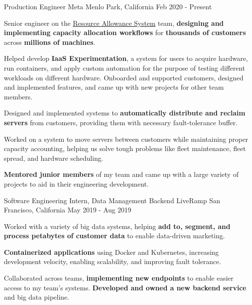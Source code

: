 

\begin{cventries}


\cventry
{Production Engineer}
{\acvHeaderIconSep Meta}
{Menlo Park, California}
{Feb 2020 - Present}
{
\begin{cvitems}
\item Senior engineer on the \href{https://dl.acm.org/doi/10.1145/3477132.3483578}{Resource Allowance System} team, \textbf{designing and implementing capacity allocation workflows} for \textbf{thousands of customers} across \textbf{millions of machines}. 
\item Helped develop \textbf{IaaS Experimentation}, a system for users to acquire hardware, run containers, and apply custom automation for the purpose of testing different workloads on different hardware. Onboarded and supported customers, designed and implemented features, and came up with new projects for other team members. 
\item Designed and implemented systems to \textbf{automatically distribute and reclaim servers} from customers, providing them with necessary fault-tolerance buffer. 
\item Worked on a system to move servers between customers while maintaining proper capacity accounting, helping us solve tough problems like fleet maintenance, fleet spread, and hardware scheduling. 
\item \textbf{Mentored junior members} of my team and came up with a large variety of projects to aid in their engineering development.
\end{cvitems}
}


    \cventry
      {Software Engineering Intern, Data Management Backend}
      {LiveRamp}
      {San Francisco, California}
      {May 2019 - Aug 2019}
      {
        \begin{cvitems}
          \item Worked with a variety of big data systems, helping \textbf{add to, segment, and process petabytes of customer data} to enable data-driven marketing.
          \item \textbf{Containerized applications} using Docker and Kubernetes, increasing development velocity, enabling scalability, and improving fault tolerance.         
          \item Collaborated across teams, \textbf{implementing new endpoints} to enable easier access to my team's systems. \textbf{Developed and owned a new backend service} and big data pipeline.
        \end{cvitems}
      }


\end{cventries}
